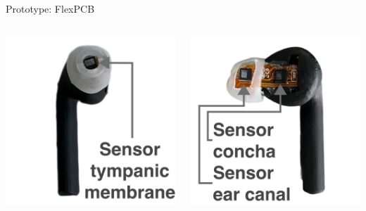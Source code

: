 \documentclass[en]{sdqbeamer}
\begin{document}
\begin{frame}{Prototype: FlexPCB}
\begin{columns}[T]
    \begin{column}{.31\textwidth}
      \includegraphics[width=0.9\linewidth]{../thesis-doc/images/prototype/Earpod_Front_visual_markers.pdf}
    \end{column}

    \begin{column}{.31\textwidth}
      \includegraphics[width=0.9\linewidth]{../thesis-doc/images/prototype/Earpod_Side2_visual_markers.pdf}
    \end{column}
  \end{columns}
\end{frame}
\end{document}
